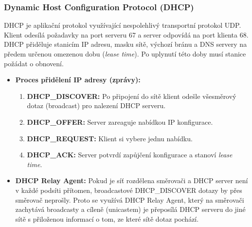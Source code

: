     \subsubsection{Dynamic Host Configuration Protocol (DHCP)}
        DHCP je aplikační protokol využívající nespolehlivý transportní protokol UDP. Klient odesílá požadavky na port serveru 67 a server odpovídá na port klienta 68. DHCP přiděluje stanicím IP adresu, masku sítě, výchozí bránu a DNS servery na předem určenou omezenou dobu (\textit{lease time}). Po uplynutí této doby musí stanice požádat o obnovení.
        \begin{itemize}
            \item \textbf{Proces přidělení IP adresy (zprávy):}
            \begin{enumerate}
                \item \textbf{DHCP\_DISCOVER:} Po připojení do sítě klient odešle všesměrový dotaz (broadcast) pro nalezení DHCP serveru.
                \item \textbf{DHCP\_OFFER:} Server zareaguje nabídkou IP konfigurace.
                \item \textbf{DHCP\_REQUEST:} Klient si vybere jednu nabídku.
                \item \textbf{DHCP\_ACK:} Server potvrdí zapůjčení konfigurace a stanoví \textit{lease time}.
            \end{enumerate}
            \item \textbf{DHCP Relay Agent:} Pokud je síť rozdělena směrovači a DHCP server není v každé podsíti přítomen, broadcastové DHCP\_DISCOVER dotazy by přes směrovač neprošly. Proto se využívá DHCP Relay Agent, který na směrovači zachytává broadcasty a cíleně (unicastem) je přeposílá DHCP serveru do jiné sítě s přiloženou informací o tom, ze které sítě dotaz pochází.
        \end{itemize}
